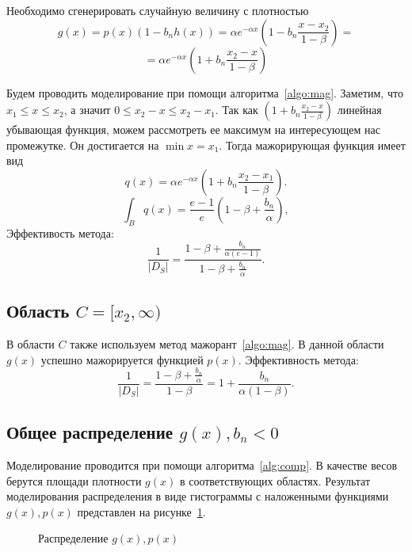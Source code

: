 \documentclass[12pt, specialist, subf, substylefile = spbu.rtx]{disser}
\begin{document}
Необходимо сгенерировать случайную величину с плотностью
$$
g(x) = p(x)(1-b_n h(x)) = \alpha e^{-\alpha x}(1-b_n \frac{x-x_2}{1-\beta})=
$$
\begin{equation}\label{eq:b2_g}
=\alpha e^{-\alpha x}(1+b_n \frac{x_2-x}{1-\beta})
\end{equation}

Будем проводить моделирование при помощи алгоритма~\ref{algo:mag}. Заметим, что $x_1 \le x \le x_2$, а значит $0 \le x_2-x \le x_2-x_1$.
Так как $(1+b_n \frac{x_2-x}{1-\beta})$ линейная убывающая функция, можем рассмотреть ее максимум на интересующем нас промежутке. Он достигается на $\min x = x_1$. Тогда мажорирующая функция имеет вид
$$
q(x)=\alpha e^{-\alpha x}(1+b_n \frac{x_2-x_1}{1-\beta}).
$$
$$
\int_B q(x)=\frac{e-1}{e}(1-\beta+\frac{b_n}{\alpha}),
$$
Эффективость метода:
$$
\frac{1}{|D_S|}=\frac{1-\beta+\frac{b_n}{\alpha(e-1)}}{1-\beta+\frac{b_n}{\alpha}}.
$$



\subsection{Область $C=[x_2, \infty)$}

В области $C$ также используем метод мажорант~\ref{algo:mag}. В данной области $g(x)$ успешно мажорируется функцией $p(x)$. Эффективность метода:
$$
\frac{1}{|D_S|}=\frac{1-\beta+\frac{b_n}{\alpha}}{1-\beta}=1+\frac{b_n}{\alpha(1-\beta)}.
$$



\subsection{Общее распределение $g(x), b_n < 0$}

Моделирование проводится при помощи алгоритма~\ref{alg:comp}. В качестве весов берутся площади плотности $g(x)$ в соответствующих областях. Результат моделирования распределения в виде гистограммы с наложенными функциями $g(x), p(x)$ представлен на рисунке~\ref{ris:hist2}. 

\begin{figure}[h]
\caption{Распределение $g(x), p(x)$}
\label{ris:hist2}
\end{figure}
\end{document}
